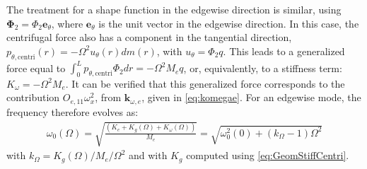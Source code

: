 \documentclass[wes, manuscript]{copernicus}
\renewcommand{\v}[1]{\boldsymbol{#1}}
\begin{document}
The treatment for a shape function in the edgewise direction is similar, using $\v{\Phi}_2=\Phi_2 \v{e}_\theta$, 
where $\v{e}_\theta$ is the unit vector in the edgewise direction.
In this case, the centrifugal force also has a component in the tangential direction, $p_{\theta,\text{centri}}(r) = -\Omega^2u_\theta(r) dm(r)$, with $u_\theta=\Phi_2 q$. 
This leads to a generalized force equal to $\int_0^L p_{\theta,\text{centri}} \Phi_2 dr=-\Omega^2 M_{e} q$, or, equivalently, to a stiffness term: $K_{\omega}=-\Omega^2 M_{e}$.
It can be verified that this generalized force corresponds to the contribution $O_{e,11}\omega_x^2$, from $\v{k}_{\omega,e}$, given in \autoref{eq:komegae}.
For an edgewise mode, the frequency therefore evolves as: 
\begin{align}
 \omega_0(\Omega)=\sqrt{\frac{(K_{e}+ K_g(\Omega)+K_\omega(\Omega))}{M_e}}=\sqrt{\omega_0^2(0)+(k_\Omega-1)\Omega^2}
\end{align}
 with $k_\Omega=K_g(\Omega)/M_e/\Omega^2$ and with $K_g$ computed using \autoref{eq:GeomStiffCentri}.
\end{document}
